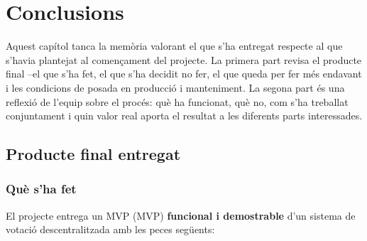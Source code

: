 

\chapter{Conclusions}
\label{ch:conclusions}

Aquest capítol tanca la memòria valorant el que s'ha entregat respecte al que s'havia plantejat al començament del
projecte.
La primera part revisa el producte final --el que s'ha fet, el que s'ha decidit no fer, el que queda per fer més
endavant i les condicions de posada en producció i manteniment.
La segona part és una reflexió de l'equip sobre el procés: què ha funcionat, què no, com s'ha treballat conjuntament i
quin valor real aporta el resultat a les diferents parts interessades.



\section{Producte final entregat}
\label{sec:producte-final}

\subsection{Què s'ha fet}
\label{subsec:que-s'ha-fet}

El projecte entrega un \acl{MVP} (\ac{MVP}) \textbf{funcional i demostrable} d'un sistema de votació descentralitzada
amb les peces següents:

